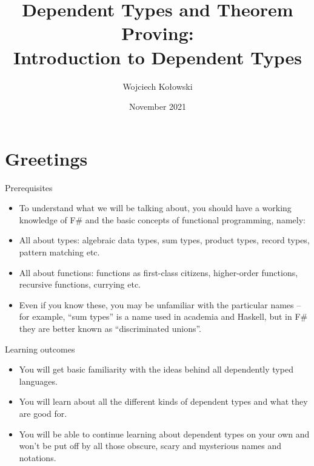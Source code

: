 \documentclass{beamer}
\title{Dependent Types and Theorem Proving: \\Introduction to Dependent Types}
\author{Wojciech Kołowski}
\date{November 2021}
\begin{document}
\frame{\titlepage}

\section{Greetings}

\begin{frame}{Prerequisites}
\begin{itemize}
	\item To understand what we will be talking about, you should have a working knowledge of F\# and the basic concepts of functional programming, namely:
	\item All about types: algebraic data types, sum types, product types, record types, pattern matching etc.
	\item All about functions: functions as first-class citizens, higher-order functions, recursive functions, currying etc.
	\item Even if you know these, you may be unfamiliar with the particular names -- for example, ``sum types'' is a name used in academia and Haskell, but in F\# they are better known as ``discriminated unions''.
\end{itemize}
\end{frame}

\begin{frame}{Learning outcomes}
\begin{itemize}
	\item You will get basic familiarity with the ideas behind all dependently typed languages.
	\item You will learn about all the different kinds of dependent types and what they are good for.
	\item You will be able to continue learning about dependent types on your own and won't be put off by all those obscure, scary and mysterious names and notations.
\end{itemize}
\end{frame}

\frame{\tableofcontents}
\end{document}

